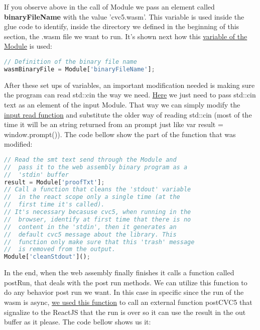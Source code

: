 \documentclass[12pt, a4paper]{article}
\begin{document}
If you observe above in the call of Module we pass an element called \textbf{binaryFileName} with the value ’cvc5.wasm’. This variable is used inside the glue code to identify, inside the directory we defined in the beginning of this section, the .wasm file we want to run. It's shown next how this  \href{https://github.com/ufmg-smite/proof-visualizer/blob/main/frontend/src/wasm/cvc5.js#L312-L313}{variable of the Module} is used:

\begin{lstlisting}[language=JavaScript]
// Definition of the binary file name
wasmBinaryFile = Module['binaryFileName'];
\end{lstlisting}

After these set ups of variables, an important modification needed is making sure the program can read std::cin the way we need. \href{
https://github.com/ufmg-smite/proof-visualizer/blob/main/frontend/src/wasm/cvc5.js#L730-L743}{Here} we just need to pass std::cin text as an element of the input Module. That way we can simply modify the \href{https://github.com/ufmg-smite/proof-visualizer/blob/main/frontend/src/wasm/cvc5.js#L726}{input read function} and substitute the older way of reading std::cin (most of the time it will be an string returned from an prompt just like var result = window.prompt()). The code bellow show the part of the function that was modified:

\begin{lstlisting}[language=JavaScript]
// Read the smt text send through the Module and
//  pass it to the web assembly binary program as a
//  'stdin' buffer
result = Module['proofTxt'];
// Call a function that cleans the 'stdout' variable
//  in the react scope only a single time (at the
//  first time it's called).
// It's necessary becasuse cvc5, when running in the
//  browser, identify at first time that there is no
//  content in the 'stdin', then it generates an
//  default cvc5 message about the library. This
//  function only make sure that this 'trash' message
//  is removed from the output.
Module['cleanStdout']();
\end{lstlisting}

In the end, when the web assembly finally finishes it calls a function called 
postRun, that deals with the post run methods. We can utilize this function to 
do any behavior post run we want. In this case in specific since the run of the 
wasm is async, \href{https://github.com/ufmg-smite/proof-visualizer/blob/main/frontend/src/wasm/cvc5.js#L264-L270}{we used this function} 
to call an external function postCVC5 that signalize to the ReactJS that the run
is over so it can use the result in the out buffer as it please. The code 
bellow shows us it:
\end{document}
